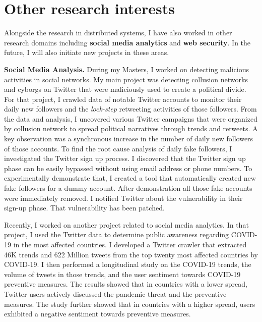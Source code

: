 \documentclass{NSF}
\newcommand{\BfPara}[1]{{\noindent\textbf{#1.}}\xspace}
\begin{document}
\section{Other research interests} \vspace{-1mm}
Alongside the research in distributed systems, I have also worked in other research domains including \textbf{social media analytics} and \textbf{web security}. In the future, I will also initiate new projects in these areas. 

\vspace{2mm}

\BfPara{Social Media Analysis} During my Masters, I worked on detecting malicious activities in social networks. My main project was detecting collusion networks and cyborgs on Twitter that were maliciously used to create a political divide. For that project, I crawled data of notable Twitter accounts to monitor their daily new followers and the {\em lock-step} retweeting activities of those followers. From the data and analysis, I uncovered various Twitter campaigns that were organized by collusion network to spread political narratives through trends and retweets. A key observation was a synchronous increase in the number of daily new followers of those accounts. To find the root cause analysis of daily fake followers, I investigated the Twitter sign up process. I discovered that the Twitter sign up phase can be easily bypassed without using email address or phone numbers. To experimentally demonstrate that, I created a tool that automatically created new fake followers for a dummy account. After demonstration all those fake accounts were immediately removed. I notified Twitter about the vulnerability in their sign-up phase. That vulnerability has been patched. 

Recently, I worked on another project related to social media analytics. In that project, I used the Twitter data to determine public awareness regarding COVID-19 in the most affected countries. I developed a Twitter crawler that extracted 46K trends and 622 Million tweets from the top twenty most affected countries by COVID-19. I then performed a longitudinal study on the COVID-19 trends, the volume of tweets in those trends, and the user sentiment towards COVID-19 preventive measures. The results showed that in countries with a lower spread, Twitter users actively discussed the pandemic threat and the preventive measures. The study further showed that in countries with a higher spread, users exhibited a negative sentiment towards preventive measures. 
\end{document}
